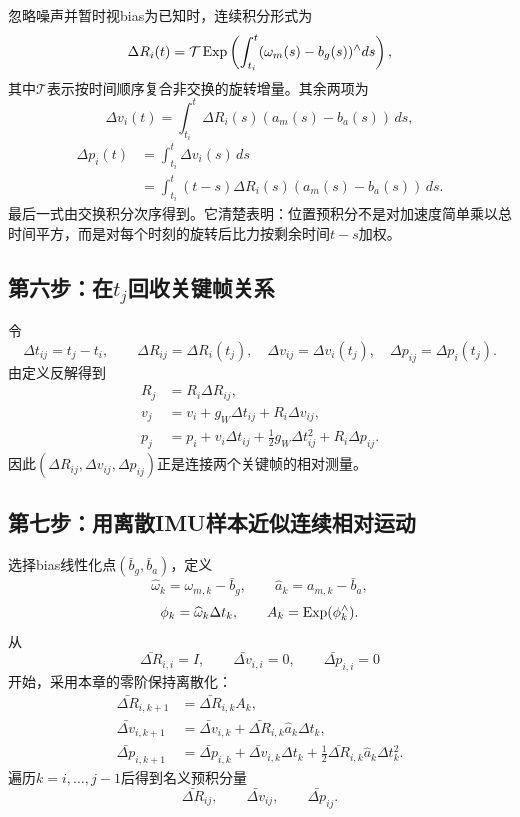 忽略噪声并暂时视bias为已知时，连续积分形式为
\[
    \Delta R_i(t)
    =\mathcal T\operatorname{Exp}\left(
       \int_{t_i}^{t}(\omega_m(s)-b_g(s))^\wedge ds
      \right),
\]
其中$\mathcal T$表示按时间顺序复合非交换的旋转增量。其余两项为
\[
\boxed{
    \Delta v_i(t)
    =\int_{t_i}^{t}
      \Delta R_i(s)(a_m(s)-b_a(s))\,ds,
}
\]
\[
\boxed{
\begin{aligned}
    \Delta p_i(t)
    &=\int_{t_i}^{t}\Delta v_i(s)\,ds\\
    &=\int_{t_i}^{t}
      (t-s)\Delta R_i(s)(a_m(s)-b_a(s))\,ds.
\end{aligned}
}
\]
最后一式由交换积分次序得到。它清楚表明：位置预积分不是对加速度简单乘以总时间平方，而是对每个时刻的旋转后比力按剩余时间$t-s$加权。

\subsection*{第六步：在$t_j$回收关键帧关系}

令
\[
    \Delta t_{ij}=t_j-t_i,
    \qquad
    \Delta R_{ij}=\Delta R_i(t_j),
    \quad
    \Delta v_{ij}=\Delta v_i(t_j),
    \quad
    \Delta p_{ij}=\Delta p_i(t_j).
\]
由定义反解得到
\[
\boxed{
\begin{aligned}
    R_j
    &=R_i\Delta R_{ij},\\
    v_j
    &=v_i+g_W\Delta t_{ij}+R_i\Delta v_{ij},\\
    p_j
    &=p_i+v_i\Delta t_{ij}
      +\frac12g_W\Delta t_{ij}^2
      +R_i\Delta p_{ij}.
\end{aligned}
}
\]
因此$(\Delta R_{ij},\Delta v_{ij},\Delta p_{ij})$正是连接两个关键帧的相对测量。

\subsection*{第七步：用离散IMU样本近似连续相对运动}

选择bias线性化点$(\bar b_g,\bar b_a)$，定义
\[
    \widehat\omega_k=\omega_{m,k}-\bar b_g,
    \qquad
    \widehat a_k=a_{m,k}-\bar b_a,
\]
\[
    \phi_k=\widehat\omega_k\Delta t_k,
    \qquad
    A_k=\operatorname{Exp}(\phi_k^\wedge).
\]
从
\[
    \bar{\Delta R}_{i,i}=I,
    \qquad
    \bar{\Delta v}_{i,i}=0,
    \qquad
    \bar{\Delta p}_{i,i}=0
\]
开始，采用本章的零阶保持离散化：
\[
\boxed{
\begin{aligned}
    \bar{\Delta R}_{i,k+1}
    &=\bar{\Delta R}_{i,k}A_k,\\
    \bar{\Delta v}_{i,k+1}
    &=\bar{\Delta v}_{i,k}
      +\bar{\Delta R}_{i,k}\widehat a_k\Delta t_k,\\
    \bar{\Delta p}_{i,k+1}
    &=\bar{\Delta p}_{i,k}
      +\bar{\Delta v}_{i,k}\Delta t_k
      +\frac12\bar{\Delta R}_{i,k}
       \widehat a_k\Delta t_k^2.
\end{aligned}
}
\]
遍历$k=i,\ldots,j-1$后得到名义预积分量
\[
    \bar{\Delta R}_{ij},
    \qquad
    \bar{\Delta v}_{ij},
    \qquad
    \bar{\Delta p}_{ij}.
\]


